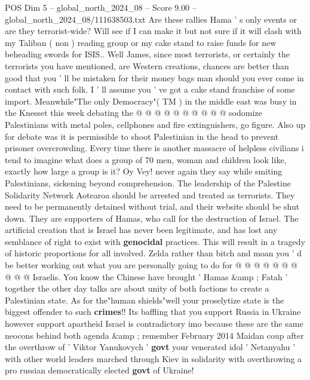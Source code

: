 \begin{textsample}{POS Dim 5 – global\_north\_2024\_08 – Score 9.00 – global\_north\_2024\_08/111638503.txt}
Are these rallies Hama ' s only events or are they terrorist-wide?
Will see if I can make it but not sure if it will clash with my Taliban ( non ) reading group or my cake stand to raise funds for new beheading swords for ISIS..
Well James, since most terrorists, or certainly the terrorists you have mentioned, are Western creations, chances are better than good that you ' ll be mistaken for their money bags man should you ever come in contact with such folk.
I ' ll assume you ' ve got a cake stand franchise of some import.
Meanwhile"The only Democracy"( TM ) in the middle east was busy in the Knesset this week debating the @ @ @ @ @ @ @ @ @ @ sodomize Palestinians with metal poles, cellphones and fire extinguishers, go figure.
Also up for debate was it is permissible to shoot Palestinian in the head to prevent prisoner overcrowding.
Every time there is another massacre of helpless civilians i tend to imagine what does a group of 70 men, woman and children look like, exactly how large a group is it?
Oy Vey! never again they say while smiting Palestinians, sickening beyond comprehension.
The leadership of the Palestine Solidarity Network Aotearoa should be arrested and treated as terrorists.
They need to be permanently detained without trial, and their website should be shut down.
They are supporters of Hamas, who call for the destruction of Israel.
The artificial creation that is Israel has never been legitimate, and has lost any semblance of right to exist with \textbf{genocidal} practices.
This will result in a tragedy of historic proportions for all involved.
Zelda rather than bitch and moan you ' d be better working out what you are personally going to do for @ @ @ @ @ @ @ @ @ @ Israelis.
You know the Chinese have brought ' Hamas \&amp ; Fatah ' together the other day talks are about unity of both factions to create a Palestinian state.
As for the"human shields"well your proselytize state is the biggest offender to such \textbf{crimes}!!
Its baffling that you support Russia in Ukraine however support apartheid Israel is contradictory imo because these are the same neocons behind both agenda \&amp ; remember February 2014 Maidan coup after the overthrow of ' Viktor Yanukovych ' \textbf{govt} your venerated idol ' Netanyahu ' with other world leaders marched through Kiev in solidarity with overthrowing a pro russian democratically elected \textbf{govt} of Ukraine!

\end{textsample}
